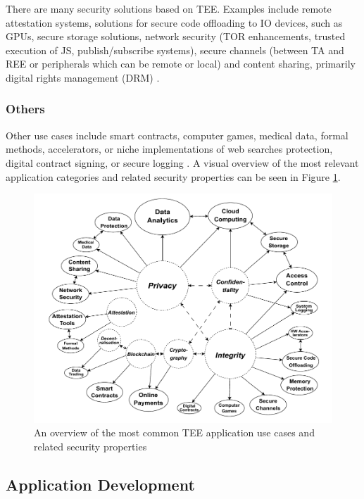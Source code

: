 \documentclass[runningheads,a4paper]{uwsese}
\begin{document}
There are many security solutions based on \gls{TEE}. Examples include remote
attestation systems, solutions for secure code offloading to IO devices, such
as GPUs, secure storage solutions, network security (TOR enhancements, trusted
execution of JS, publish/subscribe systems), secure channels (between \gls{TA} and
REE or peripherals which can be remote or local) and content sharing, primarily
digital rights management (DRM) \cite{tee_app_rev}.

\subsubsection{Others}

Other use cases include smart contracts, computer games, medical data, formal
methods, accelerators, or niche implementations of web searches protection, 
digital contract signing, or secure logging \cite{tee_app_rev}. A visual overview
of the most relevant application categories and related security properties can be
seen in Figure \ref{fig:tee_apps}.

\begin{figure}[h]
    \centering
    \includegraphics[scale=.43]{tee_apps.png}
    \caption{An overview of the most common \gls{TEE} application use cases and
        related security properties \cite{tee_app_rev}}
    \label{fig:tee_apps}
\end{figure}

\subsection{Application Development}
\end{document}
